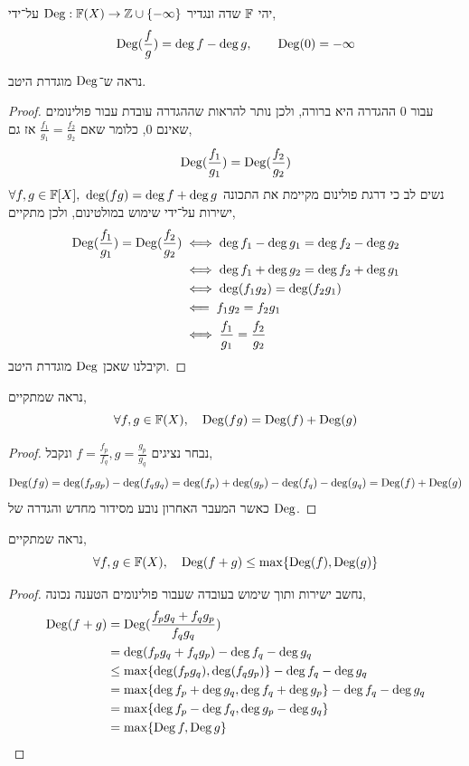 \question{}
יהי $\mathbb{F}$ שדה ונגדיר $\operatorname{Deg} : \mathbb{F}(X) \to \mathbb{Z} \cup \{ - \infty \}$ על־ידי,
\[
	\operatorname{Deg}(\frac{f}{g}) = \deg f - \deg g,
	\qquad
	\operatorname{Deg}(0) = - \infty
\]

\subquestion{}
נראה ש־$\operatorname{Deg}$ מוגדרת היטב.
\begin{proof}
	עבור $0$ ההגדרה היא ברורה, ולכן נותר להראות שההגדרה עובדת עבור פולינומים שאינם $0$, כלומר שאם $\frac{f_1}{g_1} = \frac{f_2}{g_2}$ אז גם,
	\[
		\operatorname{Deg}(\frac{f_1}{g_1})
		= \operatorname{Deg}(\frac{f_2}{g_2})
	\]
	נשים לב כי דרגת פולינום מקיימת את התכונה $\forall f, g \in \mathbb{F}[X],\ \deg(f g) = \deg f + \deg g$ ישירות על־ידי שימוש במולטינום, ולכן מתקיים,
	\begin{align*}
		\operatorname{Deg}(\frac{f_1}{g_1}) = \operatorname{Deg}(\frac{f_2}{g_2})
		& \iff \deg f_1 - \deg g_1 = \deg f_2 - \deg g_2 \\
		& \iff \deg f_1 + \deg g_2 = \deg f_2 + \deg g_1 \\
		& \iff \deg(f_1 g_2) = \deg(f_2 g_1) \\
		& \impliedby f_1 g_2 = f_2 g_1 \\
		& \iff \frac{f_1}{g_1} = \frac{f_2}{g_2}
	\end{align*}
	וקיבלנו שאכן $\operatorname{Deg}$ מוגדרת היטב.
\end{proof}

\subquestion{}
נראה שמתקיים,
\[
	\forall f, g \in \mathbb{F}(X),
	\quad
	\operatorname{Deg}(f g) = \operatorname{Deg}(f) + \operatorname{Deg}(g)
\]
\begin{proof}
	נבחר נציגים $f = \frac{f_p}{f_q}, g = \frac{g_p}{g_q}$ ונקבל,
	\[
		\operatorname{Deg}(f g)
		= \deg(f_p g_p) - \deg(f_q g_q)
		= \deg(f_p) + \deg(g_p) - \deg(f_q) - \deg(g_q)
		= \operatorname{Deg}(f) + \operatorname{Deg}(g)
	\]
	כאשר המעבר האחרון נובע מסידור מחדש והגדרה של $\operatorname{Deg}$.
\end{proof}

\subquestion{}
נראה שמתקיים,
\[
	\forall f, g \in \mathbb{F}(X),
	\quad
	\operatorname{Deg}(f + g)
	\le \max\{ \operatorname{Deg}(f), \operatorname{Deg}(g) \}
\]
\begin{proof}
	נחשב ישירות ותוך שימוש בעובדה שעבור פולינומים הטענה נכונה,
	\begin{align*}
		\operatorname{Deg}(f + g)
		& = \operatorname{Deg}(\frac{f_p g_q + f_q g_p}{f_q g_q}) \\
		& = \deg(f_p g_q + f_q g_p) - \deg f_q - \deg g_q \\
		& \le \max\{\deg(f_p g_q), \deg(f_q g_p)\} - \deg f_q - \deg g_q \\
		& = \max\{ \deg f_p + \deg g_q, \deg f_q + \deg g_p \} - \deg f_q - \deg g_q \\
		& = \max\{ \deg f_p - \deg f_q, \deg g_p - \deg g_q \} \\
		& = \max\{ \operatorname{Deg} f, \operatorname{Deg} g \}
	\end{align*}
\end{proof}

